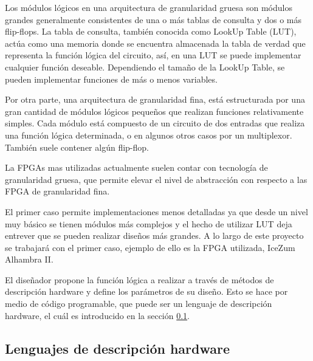 Los módulos lógicos en una arquitectura de granularidad gruesa son módulos grandes generalmente consistentes de una o más tablas de consulta y dos o más flip-flops. La tabla de consulta, también conocida como LookUp Table (LUT), actúa como una memoria donde se encuentra almacenada la tabla de verdad que representa la función lógica del circuito, así, en una LUT se puede implementar cualquier función deseable. Dependiendo el tamaño de la LookUp Table, se pueden implementar funciones de más o menos variables. \newline

Por otra parte, una arquitectura de granularidad fina, está estructurada por una gran cantidad de módulos lógicos pequeños que realizan funciones relativamente simples. Cada módulo está compuesto de un circuito de dos entradas que realiza una función lógica determinada, o en algunos otros casos por un multiplexor. También suele contener algún flip-flop.  \newline

La FPGAs mas utilizadas actualmente suelen contar con tecnología de granularidad gruesa, que permite elevar el nivel de abstracción con respecto a las FPGA de granularidad fina. \newline

El primer caso permite implementaciones menos detalladas ya que desde un nivel muy básico se tienen módulos más complejos y el hecho de utilizar LUT deja entrever que se pueden realizar diseños más grandes. A lo largo de este proyecto se trabajará con el primer caso, ejemplo de ello es la FPGA utilizada, IceZum Alhambra II. \newline

El diseñador propone la función lógica a realizar a través de métodos de descripción hardware y define los parámetros de su diseño. Esto se hace por medio de código programable, que puede ser un lenguaje de descripción hardware, el cuál es introducido en la sección \ref{sec:DescripcionHardware}. 

\subsection{Lenguajes de descripción hardware}\label{sec:DescripcionHardware}

